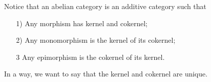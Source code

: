 \documentclass[../category_theory.tex]{subfiles}
\begin{document}
Notice that an abelian category is an additive category such that
\begin{itemize}
	\item[1)] Any morphism has kernel and cokernel;
	\item[2)] Any monomorphism is the kernel of its cokernel;
	\item[3] Any epimorphism is the cokernel of its kernel.
\end{itemize}
In a way, we want to say that the kernel and cokernel are unique.
\end{document}
